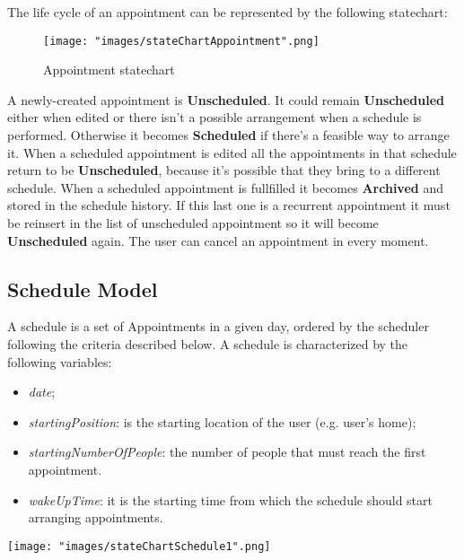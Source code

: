 The life cycle of an appointment can be represented by the following statechart:
\begin{figure}[H]
\begin{center}
\texttt{[image: "images/stateChartAppointment".png]}
\caption{Appointment statechart}
\end{center}
\end{figure}

A newly-created appointment is \textbf{Unscheduled}. It could remain \textbf{Unscheduled} either when edited or there isn't a possible arrangement when a schedule is performed. Otherwise it becomes \textbf{Scheduled} if there's a feasible way to arrange it. When a scheduled appointment is edited all the appointments in that schedule return to be \textbf{Unscheduled}, because it's possible that they bring to a different schedule. When a scheduled appointment is fullfilled it becomes \textbf{Archived} and stored in the schedule history. If this last one is a recurrent appointment it must be reinsert in the list of unscheduled appointment so it will become \textbf{Unscheduled} again. The user can cancel an appointment in every moment. 

\subsection{Schedule Model} \label{subsect:schmodel}
A schedule is a set of Appointments in a given day, ordered by the scheduler following the criteria described below.
A schedule is characterized by the following variables:
\begin{itemize}
\item \textit{date};
\item \textit{startingPosition}: is the starting location of the user (e.g. user's home);
\item \textit{startingNumberOfPeople}: the number of people that must reach the first appointment.
\item \textit{wakeUpTime}: it is the starting time from which the schedule should start arranging appointments.
\end{itemize}

\texttt{[image: "images/stateChartSchedule1".png]}


